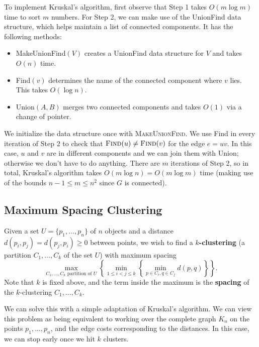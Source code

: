 To implement Kruskal's algorithm, first observe that Step 1 takes 
$O(m\log m)$ time to sort $m$ numbers. For Step 2, we can make use 
of the {\sc UnionFind} data structure, which helps maintain a 
list of connected components. It has the following methods:
\begin{itemize}
    \item {\sc MakeUnionFind}$(V)$ creates a {\sc UnionFind} data structure 
    for $V$ and takes $O(n)$ time. 
    \item {\sc Find}$(v)$ determines the name of the connected component where 
    $v$ lies. This takes $O(\log n)$. 
    \item {\sc Union}$(A, B)$ merges two connected components and takes 
    $O(1)$ via a change of pointer. 
\end{itemize}
We initialize the data structure once with \textsc{MakeUnionFind}.
We use {\sc Find} in every iteration of Step 2 to check that 
$\textsc{Find}(u) \neq \textsc{Find}(v)$ for the edge $e = uv$. In this 
case, $u$ and $v$ are in different components and we can join them with 
{\sc Union}; otherwise we don't have to do anything. There are $m$ iterations 
of Step 2, so in total, Kruskal's algorithm takes $O(m\log n) = O(m\log m)$ 
time (making use of the bounds $n-1 \leq m \leq n^2$ since $G$ is connected).

\subsection{Maximum Spacing Clustering}\label{subsec:2.5}
Given a set $U = \{p_1, \dots, p_n\}$ of $n$ objects and a distance 
$d(p_i, p_j) = d(p_j, p_i) \geq 0$ between points, we wish to find a 
{\bf $k$-clustering} (a partition $C_1, \dots, C_k$ of the set $U$) with 
maximum spacing 
\[ \max_{C_1, \dots, C_k \text{ partition of } U} 
\left\{ \min_{1\leq i<j\leq k} \left\{ \min_{p\in C_i, q \in C_j} 
d(p, q) \right\} \right\}. \] 
Note that $k$ is fixed above, and the term inside the maximum is the 
{\bf spacing} of the $k$-clustering $C_1, \dots, C_k$.

We can solve this with a simple adaptation of Kruskal's algorithm. 
We can view this problem as being equivalent to working over the complete 
graph $K_n$ on the points $p_1, \dots, p_n$,
and the edge costs corresponding to the distances. In this case, 
we can stop early once we hit $k$ clusters.

